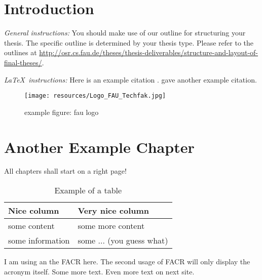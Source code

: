 \chapter{Introduction}
\label{chapter:example}

{\textsl{General instructions:}} 
You should make use of our outline for structuring your
thesis. The specific outline is determined by your thesis type.
Please refer to the outlines at 
\url{http://osr.cs.fau.de/theses/thesis-deliverables/structure-and-layout-of-final-theses/}.

{\textsl{\LaTeX\ instructions:}} Here is an example citation
\autocite{riehle:2011:controlling}.
\textcite{riehle:2007:economic} gave another example citation.

\begin{figure}
    \texttt{[image: resources/Logo\_FAU\_Techfak.jpg]}
    \caption{example figure: fau logo} 
    \label{fig:example}
\end{figure}


\chapter{Another Example Chapter}
\label{cahpter:another-example}

All chapters shall start on a right page!

\begin{table}
    \caption{Example of a table}
    \label{tab:example}
    \begin{tabular}{|l|l|}
        \hline
        Nice column &  Very nice column\\
        \hline
        some content & some more content \\
        some information & some ... (you guess what) \\
        \hline
    \end{tabular}
\end{table}

I am using an the \ac{FACR} here. The second usage of \ac{FACR} will only display the acronym itself.
\newpage
Some more text.
\newpage
Even more text on next site.